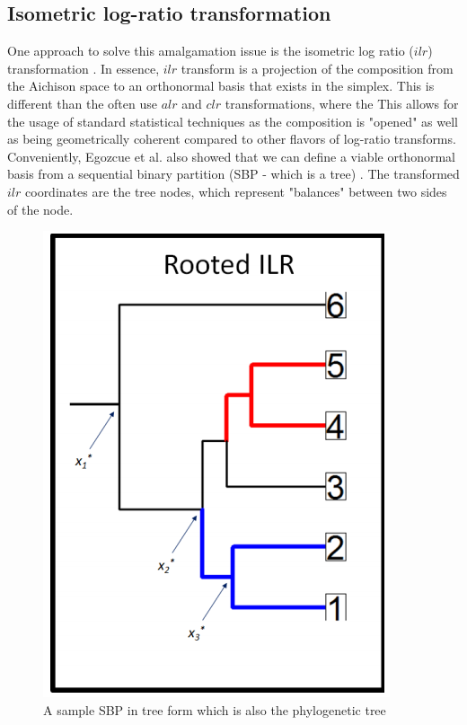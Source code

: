 \documentclass{article}
\begin{document}

\subsection{Isometric log-ratio transformation}
One approach to solve this amalgamation issue is the isometric log ratio ($ilr$) transformation \cite{egozcue2003}. In essence, $ilr$ transform is a projection of the composition from the Aichison space to an orthonormal basis that exists in the simplex. This is different than the often use $alr$ and $clr$ transformations, where the This allows for the usage of standard statistical techniques as the composition is "opened" as well as being geometrically coherent compared to other flavors of log-ratio transforms. Conveniently, Egozcue et al. also showed that we can define a viable orthonormal basis from a sequential binary partition (SBP - which is a tree) \cite{egozcue2003}. The transformed $ilr$ coordinates are the tree nodes, which represent "balances" between two sides of the node. 
\begin{figure}[!htb]
    \centering
    \includegraphics[scale = 0.5]{phylogeny_demonstration.png}
    \caption{A sample SBP in tree form which is also the phylogenetic tree}
    \label{fig:phylogeny_demonstration}
\end{figure}
\end{document}
